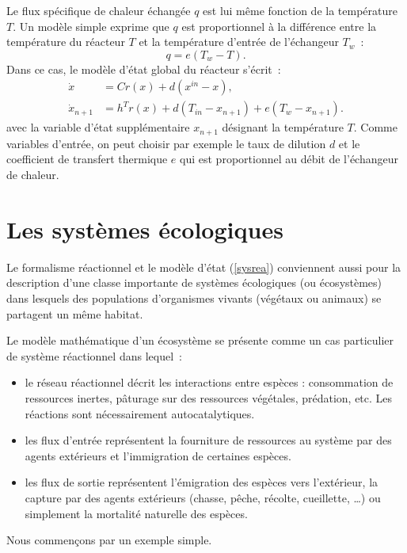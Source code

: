 Le flux spécifique de chaleur échangée $q$ est lui même
fonction de la température $T$. Un modèle simple 
exprime que $q$ est proportionnel à la différence entre la
température du réacteur $T$ et la température d'entrée de
l'échangeur $T_w$~:
$$ q = e(T_w - T). $$
Dans ce cas, le modèle d'état global du réacteur s'écrit~:
\begin{equation*} \begin{split}
\dot x &= Cr(x) + d(x^{in} - x), \\
\dot x_{n+1} &= h^T r(x) + d(T_{in} - x_{n+1}) + e(T_w - x_{n+1}).
\end{split} \end{equation*}
avec la variable d'état supplémentaire $x_{n+1}$ désignant la
température $T$. Comme variables d'entrée, on peut choisir
par exemple le taux de dilution $d$ et le coefficient de
transfert thermique $e$ qui est proportionnel au débit de
l'échangeur de chaleur.

\section{Les systèmes écologiques} 

Le formalisme réactionnel et le
modèle d'état (\ref{sysrea}) conviennent aussi pour la description
d'une classe importante de systèmes écologiques (ou écosystèmes) dans
lesquels des populations d'organismes vivants (végétaux ou animaux) se
partagent un même habitat. 

Le modèle mathématique d'un écosystème se présente comme un cas
particulier de système réactionnel dans lequel~:
\begin{itemize}
\item le réseau réactionnel décrit les interactions entre espèces :
consommation de ressources inertes, pâturage sur des ressources
végétales, prédation, etc.  Les réactions sont nécessairement
autocatalytiques. 
\item les flux d'entrée représentent la fourniture de ressources au
système par des agents extérieurs et l'immigration de certaines espèces.
\item les flux de sortie représentent l'émigration des espèces vers
l'extérieur, la capture par des agents extérieurs (chasse, pêche, récolte,
cueillette, \dots) ou simplement la mortalité naturelle des espèces.
\end{itemize}

Nous commençons par un exemple simple.

